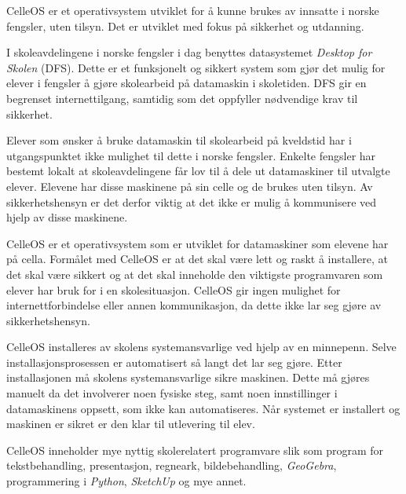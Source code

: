 \vfill\eject

\topglue 1pc

CelleOS er et operativsystem utviklet for \aa{} kunne brukes av innsatte i norske fengsler, uten tilsyn. Det er utviklet med fokus p\aa{} sikkerhet og utdanning.



I skoleavdelingene i norske fengsler i dag benyttes datasystemet {\it Desktop for Skolen} (DFS). Dette er et funksjonelt og sikkert system som gj\o r det mulig for elever i fengsler \aa{} gj\o re skolearbeid p\aa{} datamaskin i skoletiden. DFS gir en begrenset internettilgang, samtidig som det oppfyller n\o dvendige krav til sikkerhet.

Elever som \o nsker \aa{} bruke datamaskin til skolearbeid p\aa{} kveldstid har i utgangspunktet ikke mulighet til dette i norske fengsler. Enkelte fengsler har bestemt lokalt at skoleavdelingene f\aa r lov til \aa{} dele ut datamaskiner til utvalgte elever. Elevene har disse maskinene p\aa{} sin celle og de brukes uten tilsyn. Av sikkerhetshensyn er det derfor viktig at det ikke er mulig \aa{} kommunisere ved hjelp av disse maskinene.

CelleOS er et operativsystem som er utviklet for datamaskiner som elevene har p\aa{} cella. Form\aa let med CelleOS er at det skal v\ae re lett og raskt \aa{} installere, at det skal v\ae re sikkert og at det skal inneholde den viktigste programvaren som elever har bruk for i en skolesituasjon. CelleOS gir ingen mulighet for internettforbindelse eller annen kommunikasjon, da dette ikke lar seg gj\o re av sikkerhetshensyn.


CelleOS installeres av skolens systemansvarlige ved hjelp av en minnepenn. Selve installasjonsprosessen er automatisert s\aa{} langt det lar seg gj\o re. Etter installasjonen m\aa{} skolens systemansvarlige sikre maskinen. Dette m\aa{} gj\o res manuelt da det involverer noen fysiske steg, samt noen innstillinger i datamaskinens oppsett, som ikke kan automatiseres. N\aa r systemet er installert og maskinen er sikret er den klar til utlevering til elev.

CelleOS inneholder mye nyttig skolerelatert programvare slik som program for tekstbehandling, presentasjon, regneark, bildebehandling, {\it GeoGebra}, programmering i {\it Python}, {\it SketchUp} og mye annet.

